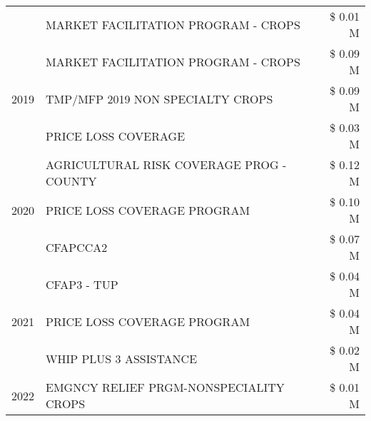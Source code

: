 \begin{tabular}{llr}
 & MARKET FACILITATION PROGRAM - CROPS & \$ 0.01 M \\
\cline{1-3}
\multirow[t]{3}{*}{2019} & MARKET FACILITATION PROGRAM - CROPS & \$ 0.09 M \\
 & TMP/MFP 2019 NON SPECIALTY CROPS & \$ 0.09 M \\
 & PRICE LOSS COVERAGE & \$ 0.03 M \\
\cline{1-3}
\multirow[t]{3}{*}{2020} & AGRICULTURAL RISK COVERAGE PROG - COUNTY & \$ 0.12 M \\
 & PRICE LOSS COVERAGE PROGRAM & \$ 0.10 M \\
 & CFAPCCA2 & \$ 0.07 M \\
\cline{1-3}
\multirow[t]{3}{*}{2021} & CFAP3 - TUP & \$ 0.04 M \\
 & PRICE LOSS COVERAGE PROGRAM & \$ 0.04 M \\
 & WHIP PLUS 3 ASSISTANCE & \$ 0.02 M \\
\cline{1-3}
2022 & EMGNCY RELIEF PRGM-NONSPECIALITY CROPS & \$ 0.01 M \\
\cline{1-3}
\bottomrule
\end{tabular}
